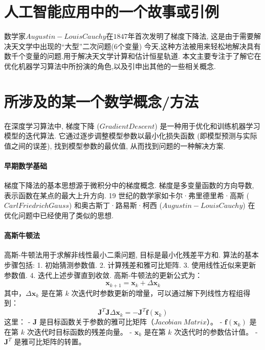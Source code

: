 \documentclass[printMode=true, declarePage=false]{ecnuthesis}
\begin{document}
    \section{人工智能应用中的一个故事或引例}

    数学家$Augustin-Louis Cauchy$在$1847$年首次发明了梯度下降法,
    这是由于需要解决天文学中出现的“大型”二次问题($6$个变量)
    今天,这种方法被用来轻松地解决具有数千个变量的问题.用于解决天文学计算和估计恒星轨道.
    本文主要专注于了解它在优化机器学习算法中所扮演的角色,以及引申出其他的一些相关概念.


    \section{所涉及的某一个数学概念/方法}

    在深度学习算法中, 梯度下降 ($Gradient Descent$) 是一种用于优化和训练机器学习模型的迭代算法.
    它通过逐步调整模型参数以最小化损失函数 (即模型预测与实际值之间的误差), 找到模型参数的最优值,
    从而找到问题的一种解决方案.

    \paragraph{早期数学基础}

    梯度下降法的基本思想源于微积分中的梯度概念.
    梯度是多变量函数的方向导数, 表示函数在某点的最大上升方向.
    19 世纪的数学家如卡尔·弗里德里希·高斯 ($Carl Friedrich Gauss$) 和奥古斯丁·路易斯·柯西 ($Augustin-Louis
    Cauchy$) 在优化问题中已经使用了类似的思想.

    \paragraph{高斯牛顿法}

    高斯-牛顿法用于求解非线性最小二乘问题, 目标是最小化残差平方和.
    算法的基本步骤包括:
    1.
    初始猜测参数值.
    2.
    计算残差和雅可比矩阵.
    3.
    使用线性近似来更新参数值.
    4.
    迭代上述步骤直到收敛.
    高斯-牛顿法的更新公式为：
    \[ \mathbf{x}_{k+1} = \mathbf{x}_k + \Delta \mathbf{x}_k \]
    其中，\(\Delta \mathbf{x}_k\) 是在第 \(k\) 次迭代时参数更新的增量，可以通过解下列线性方程组得到：
    \[ \mathbf{J}^T \mathbf{J} \Delta \mathbf{x}_k = -\mathbf{J}^T \mathbf{f}(\mathbf{x}_k) \]
    这里：
    - \(\mathbf{J}\) 是目标函数关于参数的雅可比矩阵（$Jacobian\ Matrix$）。
    - \(\mathbf{f}(\mathbf{x}_k)\) 是在第 \(k\) 次迭代时目标函数的残差向量。
    - \(\mathbf{x}_k\) 是在第 \(k\) 次迭代时的参数估计值。
    - \(\mathbf{J}^T\) 是雅可比矩阵的转置。
\end{document}
